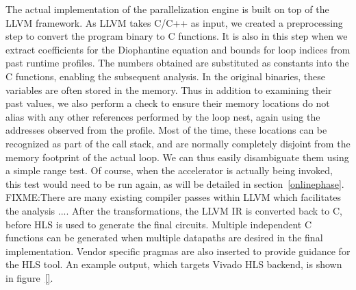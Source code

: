 The actual implementation of the parallelization engine is built
on top of the LLVM framework. As LLVM takes C/C++ as input, we created a preprocessing step
to convert the program binary to C functions. It is also in this step when we extract
coefficients for the Diophantine equation and bounds for loop indices from past runtime profiles.
The numbers obtained are substituted as constants into the C functions, enabling the subsequent analysis. 
In the original binaries, these variables are often stored in the memory. 
Thus in addition to examining their past values, we also perform a check to ensure their memory
locations do not alias with any other references performed by the loop nest, again using the
addresses observed from the profile. Most of the time, these locations can be
recognized as part of the call stack, and are normally completely disjoint from
the memory footprint of the actual loop. We can thus easily disambiguate them using a simple
range test. Of course, when the accelerator is actually being invoked, this test would need to be
run again, as will be detailed in section~\ref{onlinephase}.
FIXME:There are many existing compiler passes within LLVM which facilitates the analysis ....
After the transformations, the LLVM IR is converted back to C, before HLS is used
to generate the final circuits. Multiple independent C functions can be generated
when multiple datapaths are desired in the final implementation. Vendor specific
pragmas are also inserted to provide guidance for the HLS tool. An example output,
which targets Vivado HLS backend, is shown in figure~\ref{}. 

